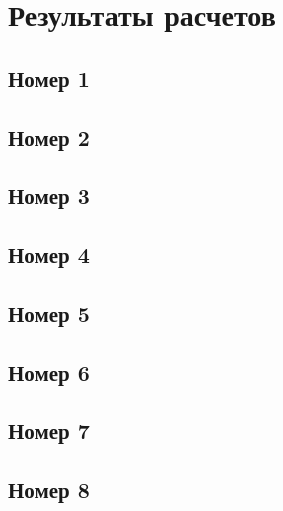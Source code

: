\documentclass[a4paper,14pt]{extarticle} %
\begin{document}


\tableofcontents %
\clearpage


\newpage

\newpage
\section{Результаты расчетов}
\subsection{Номер 1}



\newpage

\subsection{Номер 2}



\newpage

\subsection{Номер 3}



\newpage

\subsection{Номер 4}



\newpage

\subsection{Номер 5}



\newpage

\subsection{Номер 6}



\newpage

\subsection{Номер 7}



\newpage

\subsection{Номер 8}



\newpage

\newpage
%
\newpage
\end{document}
